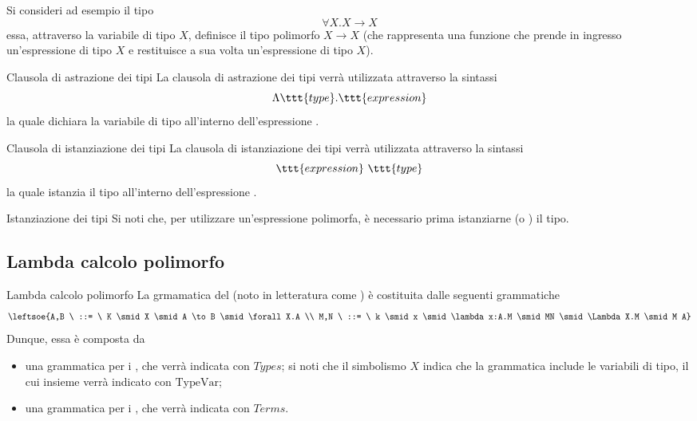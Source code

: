 \documentclass[a4paper, 12pt]{report}
\begin{document}
    \begin{example}
        Si consideri ad esempio il tipo $$\forall X.X \to X$$ essa, attraverso la variabile di tipo $X$, definisce il tipo polimorfo $X \to X$ (che rappresenta una funzione che prende in ingresso un'espressione di tipo $X$ e restituisce a sua volta un'espressione di tipo $X$).
    \end{example}

    \begin{frameddefn}{Clausola di astrazione dei tipi}
        La clausola di astrazione dei tipi verrà utilizzata attraverso la sintassi $$\Lambda \ttt{type}.\ttt{expression}$$ la quale dichiara la variabile di tipo  all'interno dell'espressione .
    \end{frameddefn}

    \begin{frameddefn}{Clausola di istanziazione dei tipi}
       La clausola di istanziazione dei tipi verrà utilizzata attraverso la sintassi $$\ttt{expression} \ \ttt{type}$$ la quale istanzia il tipo  all'interno dell'espressione .
    \end{frameddefn}

    \begin{framedobs}{Istanziazione dei tipi}
        Si noti che, per utilizzare un'espressione polimorfa, è necessario prima istanziarne (o ) il tipo.
    \end{framedobs}

    \subsection{Lambda calcolo polimorfo}

    \begin{frameddefn}{Lambda calcolo polimorfo}
        La grmamatica del  (noto in letteratura come ) è costituita dalle seguenti grammatiche $$\leftsoe{A,B \ ::= \ K \smid X \smid A \to B \smid \forall X.A \\ M,N \ ::= \ k \smid x \smid \lambda x:A.M \smid MN \smid \Lambda X.M \smid M A}$$ Dunque, essa è composta da
        \begin{itemize}
            \item una grammatica per i , che verrà indicata con $Types$; si noti che il simbolismo $X$ indica che la grammatica include le variabili di tipo, il cui insieme verrà indicato con $\mathrm{TypeVar}$;
            \item una grammatica per i , che verrà indicata con $Terms$.
        \end{itemize}
    \end{frameddefn}
\end{document}
